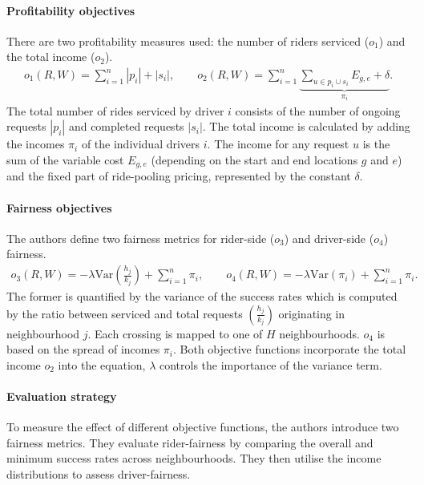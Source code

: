 \paragraph{Profitability objectives}
There are two profitability measures used: the number of riders serviced ($o_1$) and the total income ($o_2$).
\begin{gather}
    o_{1}(R, W) = \sum_{i=1} ^{n} |p_{i}| + |s_{i}|, \qquad o_{2}(R, W) = \sum_{i=1} ^{n} \underbrace{\sum_{u\in p_{i} \cup s_{i}} E_{g,e} + \delta}_{\pi_{i}}.
\end{gather}
The total number of rides serviced by driver $i$ consists of the number of ongoing requests $|p_{i}|$ and completed requests $|s_{i}|$. The total income is calculated by adding the incomes $\pi_{i}$ of the individual drivers $i$. The income for any request $u$ is the sum of the variable cost $E_{g,e}$ (depending on the start and end locations $g$ and $e$) and the fixed part of ride-pooling pricing, represented by the constant $\delta$.

\paragraph{Fairness objectives}
The authors define two fairness metrics for rider-side ($o_3$) and driver-side ($o_4$) fairness.
    \begin{gather}
    o_{3}(R, W) = -\lambda \textrm{Var}\left(\frac{h_{j}}{k_{j}}\right) + \sum_{i=1} ^{n} \pi_{i}, \qquad  o_{4}(R, W) = -\lambda \textrm{Var}(\pi_{i}) + \sum_{i=1} ^{n} \pi_{i}.
    \end{gather}
The former is quantified by the variance of the success rates which is computed by the ratio between serviced and total requests $\left(\frac{h_{j}}{k_{j}}\right)$ originating in neighbourhood $j$. Each crossing is mapped to one of $H$ neighbourhoods. $o_4$ is based on the spread of incomes $\pi_i$. Both objective functions incorporate the total income $o_2$ into the equation, $\lambda$ controls the importance of the variance term.

\paragraph{Evaluation strategy} 
To measure the effect of different objective functions, the authors introduce two fairness metrics. They evaluate rider-fairness by comparing the overall and minimum success rates across neighbourhoods. They then utilise the income distributions to assess driver-fairness.

